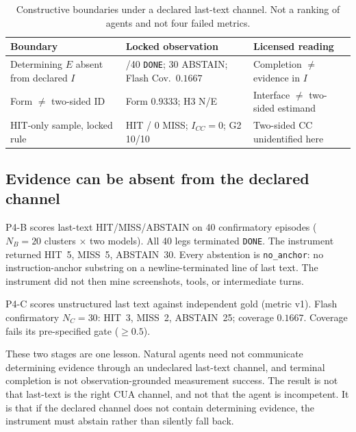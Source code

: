 \documentclass[sigconf,anonymous]{aamas}
\begin{document}
\begin{table}[H]
\centering
\caption{Constructive boundaries under a declared last-text channel. Not a ranking of agents and not four failed metrics.}
\label{tab:p4seq}
\small
\begin{tabular}{@{}>{\raggedright\arraybackslash}p{}
                   >{\raggedright\arraybackslash}p{}
                   >{\raggedright\arraybackslash}p{}@{}}
\toprule
Boundary & Locked observation & Licensed reading \\
\midrule
Determining $E$ absent from declared $I$ & 40/40 \texttt{DONE}; 30 ABSTAIN; Flash Cov.\ $0.1667$ & Completion $\neq$ evidence in $I$ \\
Form $\neq$ two-sided ID & Form $0.9333$; H3 N/E & Interface $\neq$ two-sided estimand \\
HIT-only sample, locked rule & 30 HIT / 0 MISS; $I_{CC}=0$; G2 10/10 & Two-sided CC unidentified here \\
\bottomrule
\end{tabular}
\end{table}

\subsection{Evidence can be absent from the declared channel}
\label{sec:p4bc}

P4-B scores last-text HIT/MISS/ABSTAIN on 40 confirmatory episodes ($N_B=20$ clusters $\times$ two models).
All 40 legs terminated \texttt{DONE}.
The instrument returned HIT~5, MISS~5, ABSTAIN~30.
Every abstention is \texttt{no\_anchor}: no instruction-anchor substring on a newline-terminated line of last text.
The instrument did not then mine screenshots, tools, or intermediate turns.

P4-C scores unstructured last text against independent gold (metric v1).
Flash confirmatory $N_C=30$: HIT~3, MISS~2, ABSTAIN~25; coverage $0.1667$.
Coverage fails its pre-specified gate ($\ge 0.5$).

These two stages are one lesson.
Natural agents need not communicate determining evidence through an undeclared last-text channel, and terminal completion is not observation-grounded measurement success.
The result is not that last-text is the right CUA channel, and not that the agent is incompetent.
It is that if the declared channel does not contain determining evidence, the instrument must abstain rather than silently fall back.
\end{document}
